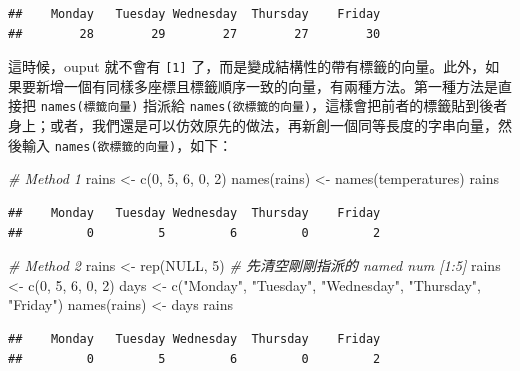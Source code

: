 \documentclass[
]{book}
\newenvironment{Shaded}{\begin{snugshade}}{\end{snugshade}}
\newcommand{\CommentTok}[1]{\textcolor[rgb]{0.56,0.35,0.01}{\textit{#1}}}
\newcommand{\ConstantTok}[1]{\textcolor[rgb]{0.00,0.00,0.00}{#1}}
\newcommand{\DecValTok}[1]{\textcolor[rgb]{0.00,0.00,0.81}{#1}}
\newcommand{\FunctionTok}[1]{\textcolor[rgb]{0.00,0.00,0.00}{#1}}
\newcommand{\NormalTok}[1]{#1}
\newcommand{\OtherTok}[1]{\textcolor[rgb]{0.56,0.35,0.01}{#1}}
\newcommand{\StringTok}[1]{\textcolor[rgb]{0.31,0.60,0.02}{#1}}
\theoremstyle{definition}
\theoremstyle{remark}
\begin{document}
\begin{verbatim}
##    Monday   Tuesday Wednesday  Thursday    Friday 
##        28        29        27        27        30
\end{verbatim}

這時候，ouput 就不會有 \texttt{{[}1{]}} 了，而是變成結構性的帶有標籤的向量。此外，如果要新增一個有同樣多座標且標籤順序一致的向量，有兩種方法。第一種方法是直接把 \texttt{names(標籤向量)} 指派給 \texttt{names(欲標籤的向量)}，這樣會把前者的標籤貼到後者身上；或者，我們還是可以仿效原先的做法，再新創一個同等長度的字串向量，然後輸入 \texttt{names(欲標籤的向量)}，如下：

\begin{Shaded}
\begin{Highlighting}[]
\CommentTok{\# Method 1}
\NormalTok{rains }\OtherTok{\textless{}{-}} \FunctionTok{c}\NormalTok{(}\DecValTok{0}\NormalTok{, }\DecValTok{5}\NormalTok{, }\DecValTok{6}\NormalTok{, }\DecValTok{0}\NormalTok{, }\DecValTok{2}\NormalTok{)}
\FunctionTok{names}\NormalTok{(rains) }\OtherTok{\textless{}{-}} \FunctionTok{names}\NormalTok{(temperatures)}
\NormalTok{rains}
\end{Highlighting}
\end{Shaded}

\begin{verbatim}
##    Monday   Tuesday Wednesday  Thursday    Friday 
##         0         5         6         0         2
\end{verbatim}

\begin{Shaded}
\begin{Highlighting}[]
\CommentTok{\# Method 2}
\NormalTok{rains }\OtherTok{\textless{}{-}} \FunctionTok{rep}\NormalTok{(}\ConstantTok{NULL}\NormalTok{, }\DecValTok{5}\NormalTok{)  }\CommentTok{\# 先清空剛剛指派的 named num [1:5]}
\NormalTok{rains }\OtherTok{\textless{}{-}} \FunctionTok{c}\NormalTok{(}\DecValTok{0}\NormalTok{, }\DecValTok{5}\NormalTok{, }\DecValTok{6}\NormalTok{, }\DecValTok{0}\NormalTok{, }\DecValTok{2}\NormalTok{)}
\NormalTok{days }\OtherTok{\textless{}{-}} \FunctionTok{c}\NormalTok{(}\StringTok{"Monday"}\NormalTok{, }\StringTok{"Tuesday"}\NormalTok{, }\StringTok{"Wednesday"}\NormalTok{, }\StringTok{"Thursday"}\NormalTok{, }\StringTok{"Friday"}\NormalTok{)}
\FunctionTok{names}\NormalTok{(rains) }\OtherTok{\textless{}{-}}\NormalTok{ days}
\NormalTok{rains}
\end{Highlighting}
\end{Shaded}

\begin{verbatim}
##    Monday   Tuesday Wednesday  Thursday    Friday 
##         0         5         6         0         2
\end{verbatim}
\end{document}
